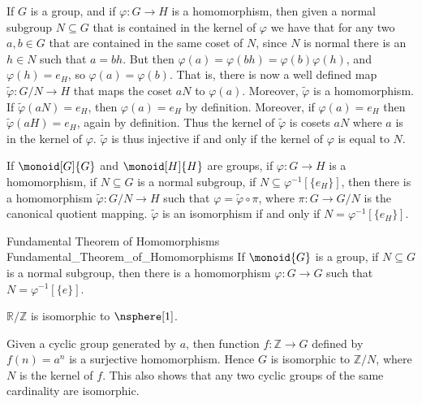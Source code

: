             If $G$ is a group, and if $\varphi:G\rightarrow{H}$ is a
            homomorphism, then given a normal subgroup $N\subseteq{G}$ that
            is contained in the kernel of $\varphi$ we have that for any two
            $a,b\in{G}$ that are contained in the same coset of $N$, since
            $N$ is normal there is an $h\in{N}$ such that $a=bh$. But then
            $\varphi(a)=\varphi(bh)=\varphi(b)\varphi(h)$, and
            $\varphi(h)=e_{H}$, so $\varphi(a)=\varphi(b)$. That is, there
            is now a well defined map $\tilde{\varphi}:G/N\rightarrow{H}$
            that maps the coset $aN$ to $\varphi(a)$. Moreover,
            $\tilde{\varphi}$ is a homomorphism. If
            $\tilde{\varphi}(aN)=e_{H}$, then $\varphi(a)=e_{H}$ by
            definition. Moreover, if $\varphi(a)=e_{H}$ then
            $\tilde{\varphi}(aH)=e_{H}$, again by definition. Thus the
            kernel of $\tilde{\varphi}$ is cosets $aN$ where $a$ is in the
            kernel of $\varphi$. $\tilde{\varphi}$ is thus injective if and
            only if the kernel of $\varphi$ is equal to $N$.
            \begin{theorem}
                If $\monoid[G]{G}$ and $\monoid[H]{H}$ are groups, if
                $\varphi:G\rightarrow{H}$ is a homomorphism, if
                $N\subseteq{G}$ is a normal subgroup, if
                $N\subseteq\varphi^{\minus{1}}[\{e_{H}\}]$, then there is a
                homomorphism $\tilde{\varphi}:G/N\rightarrow{H}$ such that
                $\varphi=\tilde{\varphi}\circ\pi$, where
                $\pi:G\rightarrow{G}/N$ is the canonical quotient mapping.
                $\tilde{\varphi}$ is an isomorphism if and only if
                $N=\varphi^{\minus{1}}[\{e_{H}\}]$.
            \end{theorem}
            \begin{ftheorem}{Fundamental Theorem of Homomorphisms}
                            {Fundamental_Theorem_of_Homomorphisms}
                If $\monoid{G}$ is a group, if $N\subseteq{G}$ is a normal
                subgroup, then there is a homomorphism
                $\varphi:G\rightarrow{G}$ such that
                $N=\varphi^{\minus{1}}[\{e\}]$.
            \end{ftheorem}
            \begin{example}
                $\mathbb{R}/\mathbb{Z}$ is isomorphic to $\nsphere[1]$.
            \end{example}
            \begin{example}
                Given a cyclic group generated by $a$, then function
                $f:\mathbb{Z}\rightarrow{G}$ defined by $f(n)=a^{n}$ is a
                surjective homomorphism. Hence $G$ is isomorphic to
                $\mathbb{Z}/N$, where $N$ is the kernel of $f$. This also
                shows that any two cyclic groups of the same cardinality
                are isomorphic.
            \end{example}

